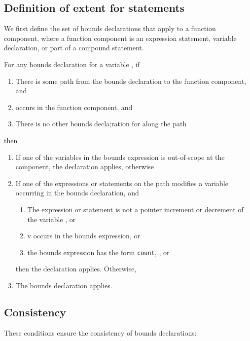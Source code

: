 \subsection{Definition of extent for statements}
\label{section:extent-definition}

We first define the set of bounds declarations that apply to a function
component, where a function component is an expression statement,
variable declaration, or part of a compound statement.

For any bounds declaration for a variable , if

\begin{enumerate}
\item
  There is some path from the bounds declaration to the function
  component, and
\item
   occurs in the function component, and
\item
  There is no other bounds decla;ration for  along the path
\end{enumerate}

then

\begin{enumerate}
\item
  If one of the variables in the bounds expression is out-of-scope at
  the component, the declaration 
  applies, otherwise
\item
  If one of the expressions or statements on the path modifies a
  variable occurring in the bounds declaration, and

  \begin{enumerate}
  \item
    The expression or statement is not a pointer increment or decrement
    of the variable , or
  \item
    v occurs in the bounds expression, or
  \item
    the bounds expression has the form \texttt{count},
    \boundsnone, or \boundsany
  \end{enumerate}
then the declaration  applies.
Otherwise,
\item
  The bounds declaration applies.
\end{enumerate}

 \subsection{Consistency}

These conditions ensure the consistency of bounds declarations:

